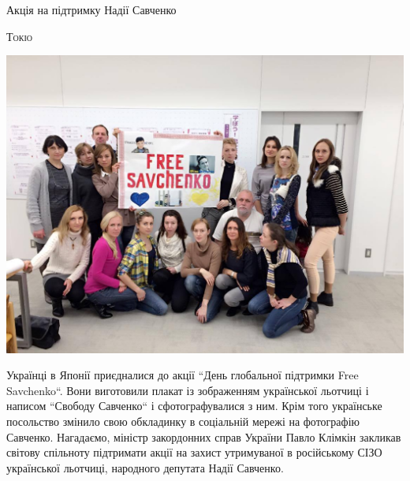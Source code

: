 \documentclass[10pt,a4paper]{article}
\newcommand{\NewsItem}[1]{%
		\usefont{T2A}{iwona}{m}{n} 
		\large #1 \vspace{4pt}
		\par \normalsize \normalfont}
\newcommand{\NewsAuthor}[1]{%
			\hfill \textsc{#1} \vspace{4pt}
			\par \normalfont}
\begin{document}
\begin{multicols}{2}

\NewsItem{Акція на підтримку Надії Савченко}
\NewsAuthor{Токіо}
\begin{center}
\includegraphics[width=0.8\linewidth]{images/12}
\end{center}
Українці в Японії приєдналися до акції ``День глобальної підтримки Free Savchenko``. Вони виготовили плакат із зображенням української льотчиці і написом ``Свободу Савченко`` і сфотографувалися з ним. Крім того українське посольство змінило свою обкладинку в соціальній мережі на фотографію Савченко. Нагадаємо, міністр закордонних справ України Павло Клімкін закликав світову спільноту підтримати акції на захист утримуваної в російському СІЗО української льотчиці, народного депутата Надії Савченко.

\vspace{1cm}


\end{multicols}
\end{document}
